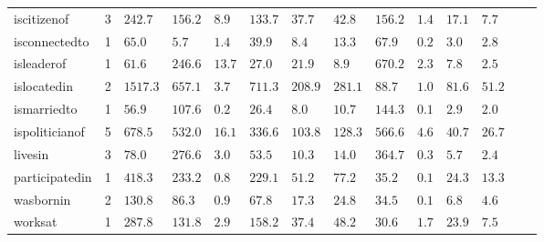 \begin{tabular}{lr|llllll|llllll}
   iscitizenof &    3 &  $242.7$ & $156.2$ &  $\bm{8.9}$ &         $133.7$ &          $37.7$ &  $42.8$ &    $156.2$ & $\bm{1.4}$ &          $17.1$ &           $7.7$ \\
 isconnectedto &    1 &   $65.0$ &   $5.7$ &  $\bm{1.4}$ &          $39.9$ &           $8.4$ &  $13.3$ &     $67.9$ & $\bm{0.2}$ &           $3.0$ &           $2.8$ \\
    isleaderof &    1 &   $61.6$ & $246.6$ & $\bm{13.7}$ &          $27.0$ &          $21.9$ &   $8.9$ &    $670.2$ & $\bm{2.3}$ &           $7.8$ &           $2.5$ \\
   islocatedin &    2 & $1517.3$ & $657.1$ &  $\bm{3.7}$ &         $711.3$ &         $208.9$ & $281.1$ &     $88.7$ & $\bm{1.0}$ &          $81.6$ &          $51.2$ \\
   ismarriedto &    1 &   $56.9$ & $107.6$ &  $\bm{0.2}$ &          $26.4$ &           $8.0$ &  $10.7$ &    $144.3$ & $\bm{0.1}$ &           $2.9$ &           $2.0$ \\
ispoliticianof &    5 &  $678.5$ & $532.0$ & $\bm{16.1}$ &         $336.6$ &         $103.8$ & $128.3$ &    $566.6$ & $\bm{4.6}$ &          $40.7$ &          $26.7$ \\
       livesin &    3 &   $78.0$ & $276.6$ &  $\bm{3.0}$ &          $53.5$ &          $10.3$ &  $14.0$ &    $364.7$ & $\bm{0.3}$ &           $5.7$ &           $2.4$ \\
participatedin &    1 &  $418.3$ & $233.2$ &  $\bm{0.8}$ &         $229.1$ &          $51.2$ &  $77.2$ &     $35.2$ & $\bm{0.1}$ &          $24.3$ &          $13.3$ \\
     wasbornin &    2 &  $130.8$ &  $86.3$ &  $\bm{0.9}$ &          $67.8$ &          $17.3$ &  $24.8$ &     $34.5$ & $\bm{0.1}$ &           $6.8$ &           $4.6$ \\
       worksat &    1 &  $287.8$ & $131.8$ &  $\bm{2.9}$ &         $158.2$ &          $37.4$ &  $48.2$ &     $30.6$ & $\bm{1.7}$ &          $23.9$ &           $7.5$ \\
\bottomrule
\end{tabular}
